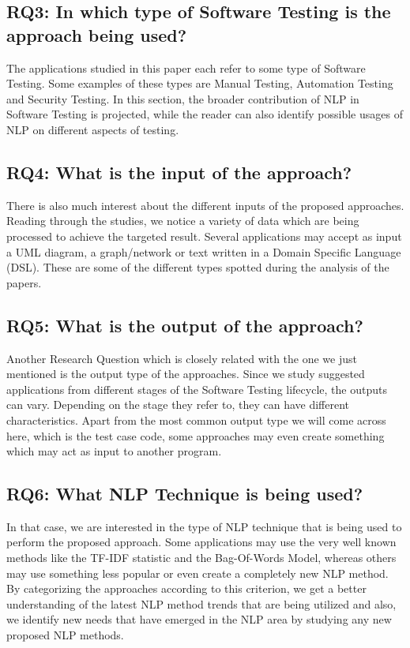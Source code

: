 \subsection {RQ3: In which type of Software Testing is the approach being used?}
The applications studied in this paper each refer to some type of Software Testing. Some examples of these types are Manual Testing, Automation Testing and Security Testing. 
In this section, the broader contribution of NLP in Software Testing is projected, while the reader can also identify possible usages of NLP on different aspects of testing.

\subsection {RQ4: What is the input of the approach?}
There is also much interest about the different inputs of the proposed approaches. Reading through the studies, we notice a variety of data which are 
being processed to achieve the targeted result. Several applications may accept as input a UML diagram, a graph/network or text written in a Domain Specific 
Language (DSL). These are some of the different types spotted during the analysis of the papers.

\subsection {RQ5: What is the output of the approach?}
Another Research Question which is closely related with the one we just mentioned is the output type of the approaches. Since we study suggested applications 
from different stages of the Software Testing lifecycle, the outputs can vary. Depending on the stage they refer to, they can have different characteristics. 
Apart from the most common output type we will come across here, which is the test case code, some approaches may even create something which may act as 
input to another program.

\subsection {RQ6: What NLP Technique is being used?}
In that case, we are interested in the type of NLP technique that is being used to perform the proposed approach. Some applications may use the very well known methods 
like the TF-IDF statistic and the Bag-Of-Words Model, whereas others may use something less popular or even create a completely new NLP method. By categorizing the approaches 
according to this criterion, we get a better understanding of the latest NLP method trends that are being utilized and also, we identify new needs that have emerged in the 
NLP area by studying any new proposed NLP methods.

